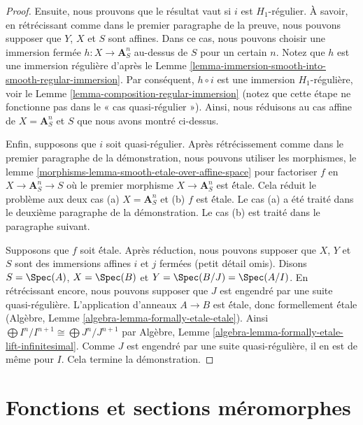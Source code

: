 \begin{proof}
\medskip\noindent
Ensuite, nous prouvons que le résultat vaut si  $i$  est
 $H_1$-régulier. À savoir, en rétrécissant comme dans le premier paragraphe
de la preuve, nous pouvons supposer que  $Y$,  $X$ et  $S$ 
sont affines. Dans ce cas, nous pouvons choisir une immersion fermée  $h : X \to \mathbf{A}^n_S$ 
au-dessus de  $S$  pour un certain  $n$. Notez que  $h$  est
une immersion régulière d'après le Lemme  \ref{lemma-immersion-smooth-into-smooth-regular-immersion}. Par conséquent,
 $h \circ i$  est une immersion  $H_1$-régulière, voir le Lemme  \ref{lemma-composition-regular-immersion} 
(notez que cette étape ne fonctionne pas dans le « cas quasi-régulier »). Ainsi,
nous réduisons au cas affine de  $X = \mathbf{A}^n_S$  et  $S$  que nous avons montré
ci-dessus.

\medskip\noindent
Enfin, supposons que  $i$  soit quasi-régulier. Après rétrécissement comme
dans le premier paragraphe de la démonstration, nous pouvons utiliser les
morphismes, le lemme  \ref{morphisms-lemma-smooth-etale-over-affine-space}  pour factoriser  $f$  en  $X \to \mathbf{A}^n_S \to S$  où
le premier morphisme  $X \to \mathbf{A}^n_S$  est  \'étale. Cela réduit le problème
aux deux cas (a)  $X = \mathbf{A}^n_S$  et (b)  $f$  est  \'étale. Le cas
(a) a été traité dans le deuxième paragraphe de la démonstration. Le cas (b) est
traité dans le paragraphe suivant.

\medskip\noindent
Supposons que  $f$  soit  \'étale. Après réduction, nous pouvons
supposer que  $X$,  $Y$ et  $S$  sont des immersions
affines  $i$  et  $j$  fermées (petit détail omis). Disons
 $S = \Spec(A)$,  $X = \Spec(B)$  et  $Y = \Spec(B/J) = \Spec(A/I)$. En rétrécissant encore, nous pouvons
supposer que  $J$  est engendré par une suite quasi-régulière.
L'application d'anneaux  $A \to B$  est  \'étale, donc formellement
 \'étale (Algèbre, Lemme  \ref{algebra-lemma-formally-etale-etale}). Ainsi  $\bigoplus I^n/I^{n + 1} \cong \bigoplus J^n/J^{n + 1}$  par Algèbre,
Lemme  \ref{algebra-lemma-formally-etale-lift-infinitesimal}. Comme  $J$  est engendré par une suite quasi-régulière,
il en est de même pour  $I$. Cela termine la démonstration.
\end{proof}











\section{Fonctions et sections méromorphes}
\label{section-meromorphic-functions}

